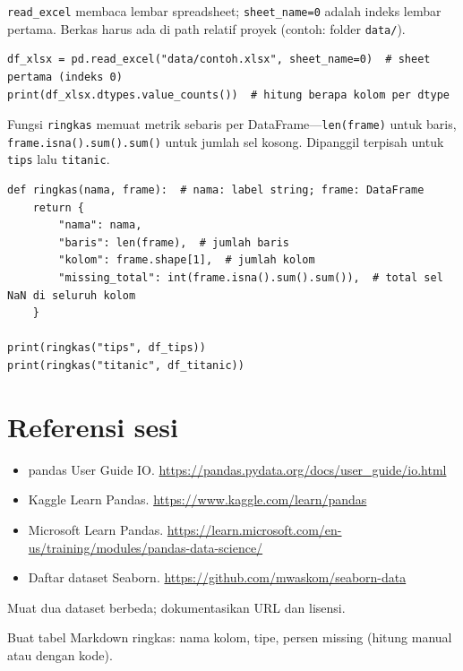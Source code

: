 \documentclass[../main.tex]{subfiles}
\begin{document}
\MulaiPenjelasanKode \texttt{read\_excel} membaca lembar spreadsheet; \texttt{sheet\_name=0} adalah indeks lembar pertama. Berkas harus ada di path relatif proyek (contoh: folder \texttt{data/}). \SelesaiPenjelasanKode

\begin{lstlisting}[caption={Membaca Excel (satu sheet, jika ada berkas lokal)}]
df_xlsx = pd.read_excel("data/contoh.xlsx", sheet_name=0)  # sheet pertama (indeks 0)
print(df_xlsx.dtypes.value_counts())  # hitung berapa kolom per dtype
\end{lstlisting}

\MulaiPenjelasanKode Fungsi \texttt{ringkas} memuat metrik sebaris per DataFrame---\texttt{len(frame)} untuk baris, \texttt{frame.isna().sum().sum()} untuk jumlah sel kosong. Dipanggil terpisah untuk \texttt{tips} lalu \texttt{titanic}. \SelesaiPenjelasanKode

\begin{lstlisting}[caption={Metrik baris, kolom, missing: \texttt{tips} lalu \texttt{titanic}}]
def ringkas(nama, frame):  # nama: label string; frame: DataFrame
    return {
        "nama": nama,
        "baris": len(frame),  # jumlah baris
        "kolom": frame.shape[1],  # jumlah kolom
        "missing_total": int(frame.isna().sum().sum()),  # total sel NaN di seluruh kolom
    }

print(ringkas("tips", df_tips))
print(ringkas("titanic", df_titanic))
\end{lstlisting}

\section{Referensi sesi}

\begin{itemize}[leftmargin=*]
  \item pandas User Guide IO. \url{https://pandas.pydata.org/docs/user_guide/io.html}
  \item Kaggle Learn Pandas. \url{https://www.kaggle.com/learn/pandas}
  \item Microsoft Learn Pandas. \url{https://learn.microsoft.com/en-us/training/modules/pandas-data-science/}
  \item Daftar dataset Seaborn. \url{https://github.com/mwaskom/seaborn-data}
\end{itemize}

\begin{aktivitas}
  \item Muat dua dataset berbeda; dokumentasikan URL dan lisensi.
  \item Buat tabel Markdown ringkas: nama kolom, tipe, persen missing (hitung manual atau dengan kode).
\end{aktivitas}
\end{document}
